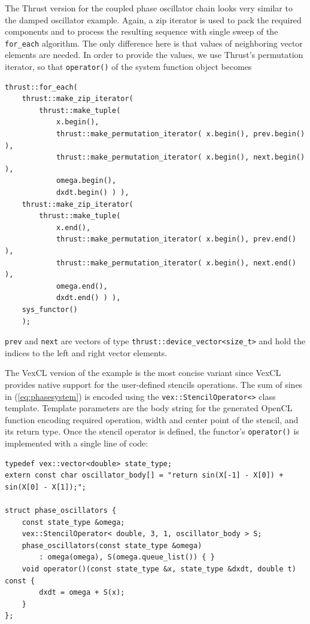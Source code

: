 \documentclass[final]{siamltex}
\newcommand{\code}[1]{\lstinline|#1|}
\newcommand{\eqref}[1]{(\ref{#1})}
\begin{document}
The Thrust version for the coupled phase oscillator chain looks very similar to
the damped oscillator example. Again, a zip iterator is used to pack the required
components and to process the resulting sequence with single sweep of the
\code{for_each} algorithm. The only difference here is that values of
neighboring vector elements are needed. In order to provide the values, we use Thrust's
permutation iterator, so that \code{operator()} of the system function object becomes
\begin{lstlisting}
thrust::for_each(
    thrust::make_zip_iterator(
        thrust::make_tuple(
            x.begin(),
            thrust::make_permutation_iterator( x.begin(), prev.begin() ),
            thrust::make_permutation_iterator( x.begin(), next.begin() ),
            omega.begin(),
            dxdt.begin() ) ),
    thrust::make_zip_iterator(
        thrust::make_tuple(
            x.end(),
            thrust::make_permutation_iterator( x.begin(), prev.end() ),
            thrust::make_permutation_iterator( x.begin(), next.end() ),
            omega.end(),
            dxdt.end() ) ),
    sys_functor()
    );
\end{lstlisting}
\code{prev} and \code{next} are vectors of type
\code{thrust::device_vector<size_t>} and hold the indices to the left and right vector
elements.

The VexCL version of the example is the most
concise variant since VexCL provides native support for the user-defined
stencils operations. The sum of sines in \eqref{eq:phasesystem} is encoded
using the \code{vex::StencilOperator<>} class template.  Template parameters
are the body string for the generated OpenCL function encoding required
operation, width and center point of the stencil, and its return type. Once the
stencil operator is defined, the functor's \code{operator()} is implemented
with a single line of code:
\begin{lstlisting}
typedef vex::vector<double> state_type;
extern const char oscillator_body[] = "return sin(X[-1] - X[0]) + sin(X[0] - X[1]);";

struct phase_oscillators {
    const state_type &omega;
    vex::StencilOperator< double, 3, 1, oscillator_body > S;
    phase_oscillators(const state_type &omega)
        : omega(omega), S(omega.queue_list()) { }
    void operator()(const state_type &x, state_type &dxdt, double t) const {
        dxdt = omega + S(x);
    }
};
\end{lstlisting}
\end{document}
